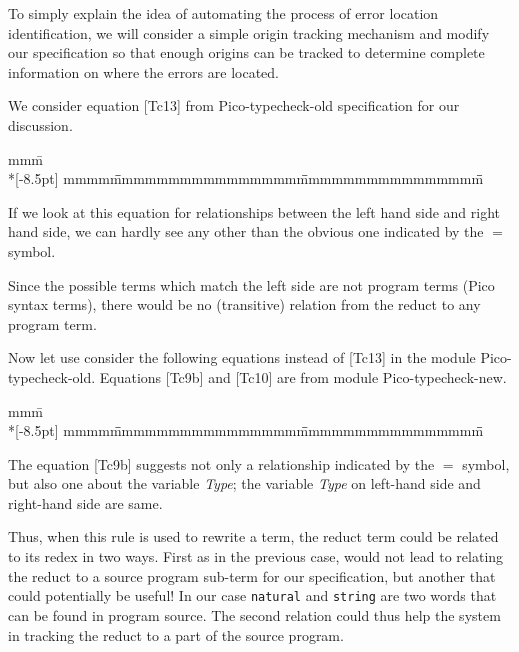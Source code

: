 To simply explain the idea of automating the process of
error location identification, we will consider a simple
origin tracking mechanism and modify our 
specification so that enough origins can be tracked
to determine complete information on where the errors
are located.

We consider equation [Tc13] from Pico-typecheck-old specification
for our discussion.

\begin{tabbing}
mmm\=\kill\pushtabs\\*[-8.5pt]
mmmm\= \=mmmmmmmmmmmmmmmm\= \=mmmmmmmmmmmmmmmm\= \=\kill
{}
\poptabs
\end{tabbing}

If we look at this equation for relationships between the
left hand side and right hand side, we can hardly see any
other than the obvious one indicated by the $=$ symbol.


\centerline{\box\graph}

\smallskip

Since the possible terms which match the left side are
not program terms (Pico syntax terms), there would be no (transitive)
relation from the reduct to any program term.

Now let use consider the following equations instead of [Tc13]
in the module Pico-typecheck-old. Equations [Tc9b] and [Tc10]
are from module Pico-typecheck-new.

\begin{tabbing}
mmm\=\kill\pushtabs\\*[-8.5pt]
mmmm\= \=mmmmmmmmmmmmmmmm\= \=mmmmmmmmmmmmmmmm\= \=\kill
{}
\\
\poptabs
\end{tabbing}

The equation [Tc9b] suggests not only a relationship
indicated by the $=$ symbol, but also one about the variable {\em Type};
the variable {\em Type} on left-hand side and right-hand side are same.


\centerline{\box\graph}

\smallskip

Thus, when this rule is used to rewrite a term,
the reduct term could be related to its redex in two ways.
First as in the previous case, would not lead to relating
the reduct to a source program sub-term for our specification, 
but another that could potentially be useful! 
In our case {\tt natural} and {\tt string} are two
words that can be found in program source. The second
relation could thus help the system in tracking the reduct to a part
of the source program.


